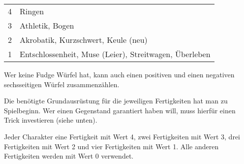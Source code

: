 \documentclass{tufte-handout}
\begin{document}
\begin{margintable}
  \begin{tabular}{cp{1.8in}}
    4 & Ringen                                                    \\
    3 & Athletik, Bogen                                           \\
    2 & Akrobatik, Kurzschwert, Keule (neu)                       \\
    1 & Entschlossenheit, Muse (Leier), Streitwagen, Überleben    \\
  \end{tabular}
\end{margintable}

Wer keine Fudge Würfel hat, kann auch einen positiven und einen
negativen sechsseitigen Würfel zusammenzählen.

Die benötigte Grundausrüstung für die jeweiligen Fertigkeiten hat man
zu Spielbeginn. Wer einen Gegenstand garantiert haben will, muss
hierfür einen Trick investieren (siehe unten).

Jeder Charakter eine Fertigkeit mit Wert 4, zwei Fertigkeiten mit Wert
3, drei Fertigkeiten mit Wert 2 und vier Fertigkeiten mit Wert 1. Alle
anderen Fertigkeiten werden mit Wert 0 verwendet.
\end{document}
